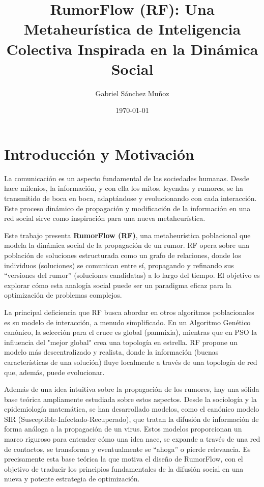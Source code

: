 \documentclass[11pt,a4paper]{article}
\title{\textbf{RumorFlow (RF): Una Metaheurística de Inteligencia Colectiva Inspirada en la Dinámica Social}}
\author{Gabriel Sánchez Muñoz}
\date{\today}
\begin{document}
\maketitle
\thispagestyle{empty}

\newpage
\tableofcontents
\newpage

\section{Introducción y Motivación}
La comunicación es un aspecto fundamental de las sociedades humanas. 
Desde hace milenios, la información, y con ella los mitos, leyendas y rumores, 
se ha transmitido de boca en boca, adaptándose y evolucionando con cada interacción. 
Este proceso dinámico de propagación y modificación de la información en una 
red social sirve como inspiración para una nueva metaheurística.

\vspace{0.5cm}

Este trabajo presenta \textbf{RumorFlow (RF)}, una metaheurística poblacional 
que modela la dinámica social de la propagación de un rumor. RF opera sobre una 
población de soluciones estructurada como un grafo de relaciones, donde los 
individuos (soluciones) se comunican entre sí, propagando y refinando sus 
``versiones del rumor'' (soluciones candidatas) a lo largo del tiempo. 
El objetivo es explorar cómo esta analogía social puede ser un paradigma 
eficaz para la optimización de problemas complejos.

\vspace{0.5cm}

La principal deficiencia que RF busca abordar en otros algoritmos poblacionales es 
su modelo de interacción, a menudo simplificado. En un Algoritmo Genético canónico, 
la selección para el cruce es global (panmixia), mientras que en PSO la influencia 
del "mejor global" crea una topología en estrella. RF propone un modelo más descentralizado 
y realista, donde la información (buenas características de una solución) fluye localmente 
a través de una topología de red que, además, puede evolucionar.

\vspace{0.5cm}

Además de una idea intuitiva sobre la propagación de los rumores, hay una sólida base
teórica ampliamente estudiada sobre estos aspectos. Desde la sociología y la epidemiología 
matemática, se han desarrollado modelos, como el canónico modelo SIR (Susceptible-Infectado-Recuperado), 
que tratan la difusión de información de forma análoga a la propagación de un virus. Estos modelos 
proporcionan un marco riguroso para entender cómo una idea nace, se expande a través de 
una red de contactos, se transforma y eventualmente se ``ahoga'' o pierde relevancia. 
Es precisamente esta base teórica la que motiva el diseño de RumorFlow, con el 
objetivo de traducir los principios fundamentales de la difusión social en una 
nueva y potente estrategia de optimización.
\end{document}
